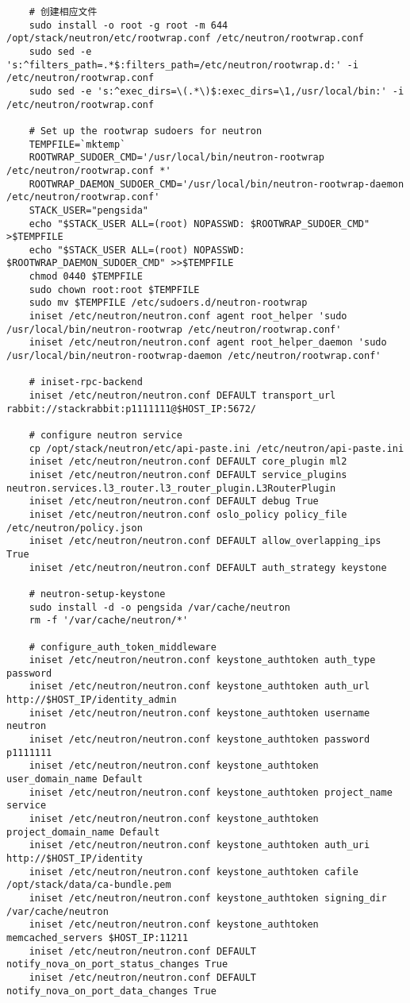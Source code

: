 \documentclass[a4paper,left=1.5cm,right=1.5cm,11pt]{article}
\begin{document}
\begin{lstlisting}
	# 创建相应文件
	sudo install -o root -g root -m 644 /opt/stack/neutron/etc/rootwrap.conf /etc/neutron/rootwrap.conf
	sudo sed -e 's:^filters_path=.*$:filters_path=/etc/neutron/rootwrap.d:' -i /etc/neutron/rootwrap.conf
	sudo sed -e 's:^exec_dirs=\(.*\)$:exec_dirs=\1,/usr/local/bin:' -i /etc/neutron/rootwrap.conf

	# Set up the rootwrap sudoers for neutron
	TEMPFILE=`mktemp`
	ROOTWRAP_SUDOER_CMD='/usr/local/bin/neutron-rootwrap /etc/neutron/rootwrap.conf *'
	ROOTWRAP_DAEMON_SUDOER_CMD='/usr/local/bin/neutron-rootwrap-daemon /etc/neutron/rootwrap.conf'
	STACK_USER="pengsida"
	echo "$STACK_USER ALL=(root) NOPASSWD: $ROOTWRAP_SUDOER_CMD" >$TEMPFILE
    echo "$STACK_USER ALL=(root) NOPASSWD: $ROOTWRAP_DAEMON_SUDOER_CMD" >>$TEMPFILE
    chmod 0440 $TEMPFILE
    sudo chown root:root $TEMPFILE
    sudo mv $TEMPFILE /etc/sudoers.d/neutron-rootwrap
	iniset /etc/neutron/neutron.conf agent root_helper 'sudo /usr/local/bin/neutron-rootwrap /etc/neutron/rootwrap.conf'
	iniset /etc/neutron/neutron.conf agent root_helper_daemon 'sudo /usr/local/bin/neutron-rootwrap-daemon /etc/neutron/rootwrap.conf'

	# iniset-rpc-backend
	iniset /etc/neutron/neutron.conf DEFAULT transport_url rabbit://stackrabbit:p1111111@$HOST_IP:5672/

	# configure neutron service
	cp /opt/stack/neutron/etc/api-paste.ini /etc/neutron/api-paste.ini
	iniset /etc/neutron/neutron.conf DEFAULT core_plugin ml2
	iniset /etc/neutron/neutron.conf DEFAULT service_plugins neutron.services.l3_router.l3_router_plugin.L3RouterPlugin
	iniset /etc/neutron/neutron.conf DEFAULT debug True
	iniset /etc/neutron/neutron.conf oslo_policy policy_file /etc/neutron/policy.json
	iniset /etc/neutron/neutron.conf DEFAULT allow_overlapping_ips True
	iniset /etc/neutron/neutron.conf DEFAULT auth_strategy keystone

	# neutron-setup-keystone
	sudo install -d -o pengsida /var/cache/neutron
	rm -f '/var/cache/neutron/*'

	# configure_auth_token_middleware
	iniset /etc/neutron/neutron.conf keystone_authtoken auth_type password
	iniset /etc/neutron/neutron.conf keystone_authtoken auth_url http://$HOST_IP/identity_admin
	iniset /etc/neutron/neutron.conf keystone_authtoken username neutron
	iniset /etc/neutron/neutron.conf keystone_authtoken password p1111111
	iniset /etc/neutron/neutron.conf keystone_authtoken user_domain_name Default
	iniset /etc/neutron/neutron.conf keystone_authtoken project_name service
	iniset /etc/neutron/neutron.conf keystone_authtoken project_domain_name Default
	iniset /etc/neutron/neutron.conf keystone_authtoken auth_uri http://$HOST_IP/identity
	iniset /etc/neutron/neutron.conf keystone_authtoken cafile /opt/stack/data/ca-bundle.pem
	iniset /etc/neutron/neutron.conf keystone_authtoken signing_dir /var/cache/neutron
	iniset /etc/neutron/neutron.conf keystone_authtoken memcached_servers $HOST_IP:11211
	iniset /etc/neutron/neutron.conf DEFAULT notify_nova_on_port_status_changes True
	iniset /etc/neutron/neutron.conf DEFAULT notify_nova_on_port_data_changes True


\end{lstlisting}
\end{document}
